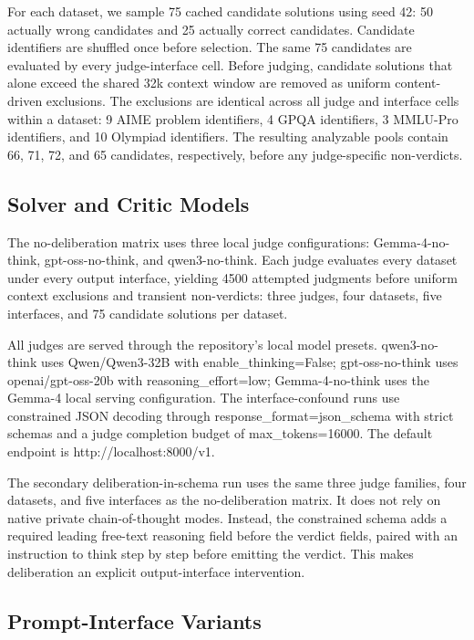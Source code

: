 \documentclass[journal]{IEEEtran}
\begin{document}
For each dataset, we sample 75 cached candidate solutions using seed 42: 50 actually wrong candidates and 25 actually correct candidates. Candidate identifiers are shuffled once before selection. The same 75 candidates are evaluated by every judge-interface cell. Before judging, candidate solutions that alone exceed the shared 32k context window are removed as uniform content-driven exclusions. The exclusions are identical across all judge and interface cells within a dataset: 9 AIME problem identifiers, 4 GPQA identifiers, 3 MMLU-Pro identifiers, and 10 Olympiad identifiers. The resulting analyzable pools contain 66, 71, 72, and 65 candidates, respectively, before any judge-specific non-verdicts.

\subsection{Solver and Critic Models}
\label{sec:models}

The no-deliberation matrix uses three local judge configurations: Gemma-4-no-think, gpt-oss-no-think, and qwen3-no-think. Each judge evaluates every dataset under every output interface, yielding 4500 attempted judgments before uniform context exclusions and transient non-verdicts: three judges, four datasets, five interfaces, and 75 candidate solutions per dataset.

All judges are served through the repository's local model presets. qwen3-no-think uses Qwen/Qwen3-32B with enable\_thinking=False; gpt-oss-no-think uses openai/gpt-oss-20b with reasoning\_effort=low; Gemma-4-no-think uses the Gemma-4 local serving configuration. The interface-confound runs use constrained JSON decoding through response\_format=json\_schema with strict schemas and a judge completion budget of max\_tokens=16000. The default endpoint is http://localhost:8000/v1.

The secondary deliberation-in-schema run uses the same three judge families, four datasets, and five interfaces as the no-deliberation matrix. It does not rely on native private chain-of-thought modes. Instead, the constrained schema adds a required leading free-text reasoning field before the verdict fields, paired with an instruction to think step by step before emitting the verdict. This makes deliberation an explicit output-interface intervention.

\subsection{Prompt-Interface Variants}
\label{sec:prompt-variants}
\end{document}
